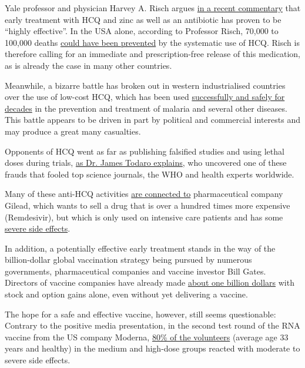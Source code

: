 Yale professor and physician Harvey A. Risch argues
\href{https://www.newsweek.com/key-defeating-covid-19-already-exists-we-need-start-using-it-opinion-1519535}{in
a recent commentary} that early treatment with HCQ and zinc as well as
an antibiotic has proven to be ``highly effective''. In the USA alone,
according to Professor Risch, 70,000 to 100,000 deaths
\href{https://www.foxnews.com/media/hydroxychloroquine-could-save-lives-ingraham-yale-professor}{could
have been prevented} by the systematic use of HCQ. Risch is therefore
calling for an immediate and prescription-free release of this
medication, as is already the case in many other countries.

Meanwhile, a bizarre battle has broken out in western industrialised
countries over the use of low-cost HCQ, which has been used
\href{https://swprs.files.wordpress.com/2020/07/hcq-white-paper-dr-simone-gold.pdf}{successfully
and safely for decades} in the prevention and treatment of malaria and
several other diseases. This battle appears to be driven in part by
political and commercial interests and may produce a great many
casualties.

Opponents of HCQ went as far as publishing falsified studies and using
lethal doses during trials,
\href{https://www.medicineuncensored.com/a-study-out-of-thin-air}{as Dr.
James Todaro explains}, who uncovered one of these frauds that fooled
top science journals, the WHO and health experts worldwide.

Many of these anti-HCQ activities
\href{https://omnij.org/Gilead:_Twenty-one_billion_reasons_to_discredit_hydroxychloroquine_(ORIGINAL_ARTICLE)}{are
connected to} pharmaceutical company Gilead, which wants to sell a drug
that is over a hundred times more expensive (Remdesivir), but which is
only used on intensive care patients and has some
\href{https://www.sciencedirect.com/science/article/pii/S1201971220305282}{severe
side effects}.

In addition, a potentially effective early treatment stands in the way
of the billion-dollar global vaccination strategy being pursued by
numerous governments, pharmaceutical companies and vaccine investor Bill
Gates. Directors of vaccine companies have already made
\href{https://www.nytimes.com/2020/07/25/business/coronavirus-vaccine-profits-vaxart.html}{about
one billion dollars} with stock and option gains alone, even without yet
delivering a vaccine.

The hope for a safe and effective vaccine, however, still seems
questionable: Contrary to the positive media presentation, in the second
test round of the RNA vaccine from the US company Moderna,
\href{https://childrenshealthdefense.org/news/vaccines/letter-to-wv-legislators-the-moderna-covid-19-vaccine-is-likely-to-make-more-people-sick-than-covid-19/}{80\%
of the volunteers} (average age 33 years and healthy) in the medium and
high-dose groups reacted with moderate to severe side effects.

